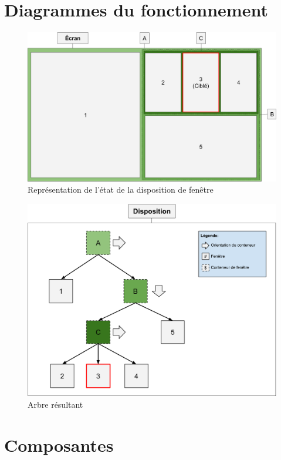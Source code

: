\documentclass[titlepage]{article}
\begin{document}
\section{Diagrammes du fonctionnement}
\begin{figure}[H]
	\centering
	\includegraphics[width=\textwidth]{diagramme_du_fonctionnement.png}
	\caption{Représentation de l'état de la disposition de fenêtre}
\end{figure}
\begin{figure}[H]
	\centering
	\includegraphics[width=\textwidth]{diagramme_du_fonctionnement_arbre.png}
	\caption{Arbre résultant}
\end{figure}

\section{Composantes}
\end{document}
